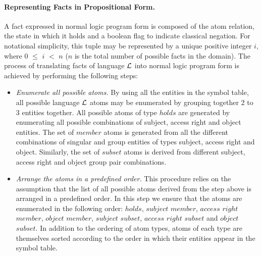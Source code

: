 \documentclass[global,twocolumn,final]{svjour}
\begin{document}
        \paragraph{Representing Facts in Propositional Form.}

          A fact expressed in normal logic program form is composed of the
          atom relation, the state in which it holds and a boolean flag to
          indicate classical negation. For notational simplicity, this tuple
          may be represented by a unique positive integer $i$, where $0$ $\leq$
          $i$ $<$ $n$ ($n$ is the total number of possible facts in the
          domain). The process of translating facts of language ${\cal L}$
          into normal logic program form is achieved by performing the
          following steps:

          \begin{itemize}

            \item
              {\em Enumerate all possible atoms.}
              By using all the entities in the symbol table, all possible
              language ${\cal L}$ atoms may be enumerated by grouping together
              2 to 3 entities together. All possible atoms of type $holds$ are
              generated by enumerating all possible combinations of subject,
              access right and object entities. The set of $member$ atoms is
              generated from all the different combinations of singular and
              group entities of types subject, access right and object.
              Similarly, the set of $subset$ atoms is derived from different
              subject, access right and object group pair combinations.

            \item
              {\em Arrange the atoms in a predefined order.}
              This procedure relies on the assumption that the list of all
              possible atoms derived from the step above is arranged in a
              predefined order. In this step we ensure that the atoms are
              enumerated in the following order: $holds$, $subject$ $member$,
              $access$ $right$ $member$, $object$ $member$, $subject$
              $subset$, $access$ $right$ $subset$ and $object$ $subset$. In
              addition to the ordering of atom types, atoms of each type are
              themselves sorted according to the order in which their entities
              appear in the symbol table.


\end{itemize}
\end{document}
